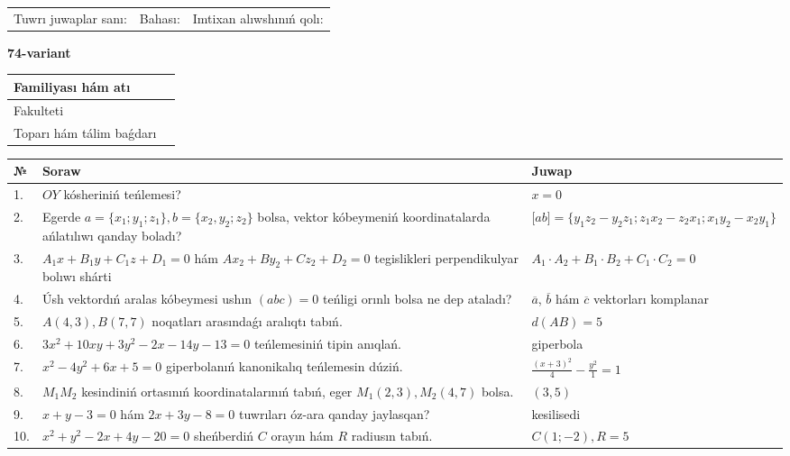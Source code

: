 \documentclass{article}
\begin{document}
\vspace{1cm}

\begin{tabular}{lll}
Tuwrı juwaplar sanı: \underline{\hspace{1.5cm}} & 
Bahası: \underline{\hspace{1.5cm}} & 
Imtixan alıwshınıń qolı: \underline{\hspace{2cm}} \\
\end{tabular}

\egroup

\newpage


\textbf{74-variant}\\

\bgroup
\def\arraystretch{1.6} %

\begin{tabular}{|m{5.7cm}|m{9.5cm}|}
\hline
Familiyası hám atı & \\
\hline
Fakulteti  & \\
\hline
Toparı hám tálim baǵdarı  & \\
\hline
\end{tabular}

\vspace{1cm}

\begin{tabular}{|m{0.7cm}|m{10cm}|m{4cm}|}
\hline
№ & Soraw & Juwap \\
\hline
1. & $OY$ kósheriniń teńlemesi? & $x=0$ \\
\hline
2. & Egerde $a=\{ x_1; y_1; z_1\}, b=\{ x_2, y_2; z_2\}$ bolsa, vektor kóbeymeniń koordinatalarda ańlatılıwı qanday boladı? &  $\lbrack ab\rbrack=\{y_1z_2-y_2z_1; z_1x_2-z_2x_1; x_1y_2-x_2y_1\}$ \\
\hline
3. & $A_1x+B_1y+C_1z+D_1=0$ hám $Ax_2+By_2+Cz_2+D_2=0$ tegislikleri perpendikulyar bolıwı shárti & $A_1\cdot A_2+B_1\cdot B_2+C_1\cdot C_2=0$ \\
\hline
4. & Úsh vektordıń aralas kóbeymesi ushın $(abc)=0$ teńligi orınlı bolsa ne dep ataladı? & $\overline{a}$, $\overline{b}$ hám $\overline{c}$ vektorları komplanar \\
\hline
5. & $A(4, 3), B(7, 7)$ noqatları arasındaǵı aralıqtı tabıń. & $d(AB)=5$ \\
\hline
6. & $3x^{2}+10xy+3y^{2}-2x-14y-13=0$ teńlemesiniń tipin anıqlań. & giperbola \\
\hline
7. & $x^{2}-4y^{2}+6x+5=0$ giperbolanıń kanonikalıq teńlemesin dúziń. & $\frac{(x+3)^{2}}{4}-\frac{y^{2}}{1}=1$ \\
\hline
8. & $M_{1}M_{2}$ kesindiniń ortasınıń koordinatalarınıń tabıń, eger $M_{1} (2, 3), M_{2} (4, 7)$ bolsa. & $(3,5)$ \\
\hline
9. & $x+y-3=0$ hám $2x+3y-8=0$ tuwrıları óz-ara qanday jaylasqan? & kesilisedi \\
\hline
10. & $x^{2}+y^{2}-2x+4y-20=0$ sheńberdiń $C$ orayın hám $R$ radiusın tabıń. & $C(1;-2), R=5$ \\
\hline
\end{tabular}
\end{document}
